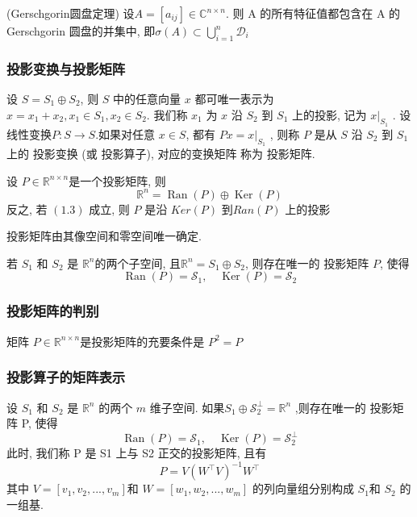 \documentclass[12pt,a4paper]{article}
\begin{document}
\begin{framed}
	\begin{theorem}(Gerschgorin圆盘定理)
	设$A=\left[a_{i j}\right] \in \mathbb{C}^{n \times n}$. 则 A 的所有特征值都包含在 A 的 Gerschgorin 圆盘的并集中, 即$\sigma(A) \subset \bigcup_{i=1}^{n} \mathcal{D}_{i}$
	\end{theorem}
\end{framed}


\subsubsection{投影变换与投影矩阵}
设 $S = S_1 ⊕ S_2$, 则 $S$ 中的任意向量 $x$ 都可唯一表示为
$x = x_1 + x_2, x_1 ∈ S_1, x_2 ∈ S_2.$
我们称 $x_1$ 为 $x$ 沿 $S_2$ 到 $S_1$ 上的投影, 记为 $x|_{S_1}$
.
设线性变换$ P : S → S. $如果对任意 $x ∈ S$, 都有
$P x = x|_{S_1}$
,
则称 $P$ 是从 $S$ 沿 $S_2$ 到 $S_1$ 上的 投影变换 (或 投影算子), 对应的变换矩阵
称为 投影矩阵.

\begin{framed}
	\begin{lemma}
		设 $P ∈ \mathbb{R}^{n×n} $是一个投影矩阵, 则
		\begin{equation}
		\mathbb{R}^{n}=\operatorname{Ran}(P) \oplus \operatorname{Ker}(P)
		\end{equation}
		反之, 若 $(1.3)$ 成立, 则 $P$ 是沿 $Ker(P)$ 到$ Ran(P)$ 上的投影
	\end{lemma}
\end{framed}
投影矩阵由其像空间和零空间唯一确定.

\begin{framed}
	\begin{lemma}
		若 $S_1$ 和 $S_2$ 是 $\mathbb{R}^n$的两个子空间, 且$ \mathbb{R}^n= S_1 ⊕ S_2$, 则存在唯一的
		投影矩阵 $P$, 使得
		$$
		\operatorname{Ran}(P)=\mathcal{S}_{1}, \quad \operatorname{Ker}(P)=\mathcal{S}_{2}
		$$
	\end{lemma}
\end{framed}

\subsubsection{投影矩阵的判别}
\begin{framed}
	\begin{theorem}
		矩阵 $P ∈\mathbb{R}^{n×n}$是投影矩阵的充要条件是 $P^2=P$
	\end{theorem}
\end{framed}

\subsubsection{投影算子的矩阵表示}
设 $S_1$ 和 $S_2$ 是 $\mathbb{R}^n$ 的两个 $m$ 维子空间. 如果$S_{1} \oplus \mathcal{S}_{2}^{\perp}=\mathbb{R}^{n}$ ,则存在唯一的
投影矩阵 P, 使得
$$
\operatorname{Ran}(P)=\mathcal{S}_{1}, \quad \operatorname{Ker}(P)=\mathcal{S}_{2}^{\perp}
$$
此时, 我们称 P 是 S1 上与 S2 正交的投影矩阵, 且有
$$
P=V\left(W^{\top} V\right)^{-1} W^{\top}
$$
其中 $V = [v_1, v_2, . . . , v_m] $和 $W = [w_1, w_2, . . . , w_m]$ 的列向量组分别构成
$S_1 $和 $S_2$ 的一组基.
\end{document}
